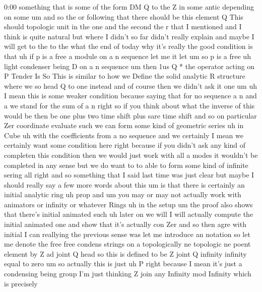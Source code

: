 \begin{unfinished}{0:00}
something  that  is  some  of  the  form  DM  Q
to  the
Z  in  some
antic  depending  on
some  um  and  so
the  or
following
that  there  should  be  this  element  Q  This
should  topologic
unit  in
the
one  and  the  second  the  r  that  I
mentioned  and  I  think  is  quite  natural
but  where  I  didn't  so  far  didn't  really
explain  and  maybe  I  will  get  to  the  to
the  what  the  end  of  today  why  it's
really  the  good  condition  is
that  uh  if  p  is  a
free  a
module  on  a  n
sequence  let  me
it
let  um  so  p  is  a  free  uh  light  condenser
being  D  on  a  n  sequence  um
then  1us  Q  *  the
operator  acting  on  P
Tender
Is  So  This  is  similar  to  how  we  Define
the  solid  analytic  R  structure  where  we
so  head  Q  to  one  instead  and  of  course
then  we  didn't  ask  it
one
um  uh  I  mean  this  is  some  weaker
condition
because  saying
that  for  no
sequence  a  n  and
a  we  stand
for  the  sum  of  a
n  right  so  if  you  think  about  what  the
inverse  of  this  would  be  then  be  one
plus  two  time  shift  plus  sare  time  shift
and  so  on  particular  Zer  coordinate
evaluate  such  we  can  form  some  kind  of
geometric  series  uh  in  Cube  uh  with  the
coefficients  from  a  no
sequence  and  we  certainly  I  mean  we
certainly  want  some  condition  here  right
because  if  you  didn't  ask  any  kind  of
completen  this
condition  then  we  would  just  work  with
all  a  modes  it  wouldn't  be  completed  in
any  sense  but  we  do  want  to  to  able  to
form  some  kind  of  infinite
sering  all  right  and  so  something  that  I
said  last  time  was  just  clear  but  maybe
I  should  really  say  a  few  more  words
about  this  um  is  that  there  is  certainly
an  initial  analytic  ring  uh
prop
and
um  you  may  or  may  not  actually  work  with
animators  or  infinity  or  whatever  Rings
uh  in  the  setup
um  the  proof  also  shows  that  there's
initial  animated  such  uh  later  on  we
will  I  will  actually  compute  the  initial
animated  one  and  show  that  it's  actually
con  Zer  and  so  then  agre  with  initial  I
can  reallying  the  previous  sense
was
let  me  introduce  an  notation  so  let  me
denote  the  free  free  condens  strings  on
a  topologically  ne  topologic  ne  poent
element  by  Z  ad  joint  Q  head  so  this  is
defined  to  be  Z  joint  Q
infinity  infinity  equal  to  zero
um  so  actually  this  is  just  uh  P  right
because  I  mean  it's  just  a  condensing
being  group  I'm  just  thinking  Z  join  any
Infinity  mod  Infinity  which  is  precisely

\end{unfinished}

